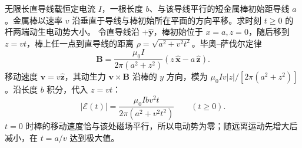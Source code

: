 \problemtext 无限长直导线载恒定电流 $I$，一根长度 $b$、与该导线平行的短金属棒初始距导线 $a$。金属棒以速率 $v$ 沿垂直于导线与棒初始所在平面的方向平移。求时刻 $t\ge0$ 的杆两端动生电动势大小。
\workings 令直导线沿 $+\hat{\bm y}$，棒初始位于 $x=a,z=0$，随后移到 $z=vt$，棒上任一点到直导线的距离 $\rho=\sqrt{a^2+v^2t^2}$。毕奥--萨伐尔定律
\[\bm B=\frac{\mu_0I}{2\pi(a^2+z^2)}
\left(z\,\hat{\bm x}-a\,\hat{\bm z}\right).\]
移动速度 $\bm v=v\hat{\bm z}$，其动生力 $\bm v\times\bm B$ 沿棒的 $y$ 方向，模为 $\mu_0 I v|z|/[2\pi(a^2+z^2)]$。沿长度 $b$ 积分，代入 $z=vt$：
\[
\boxed{|\mathcal E(t)|=
\frac{\mu_0I b v^2t}{2\pi(a^2+v^2t^2)}}\qquad(t\ge0).
\]
\crosscheck $t=0$ 时棒的移动速度恰与该处磁场平行，所以电动势为零；随远离运动先增大后减小，在 $t=a/v$ 达到极大值。
